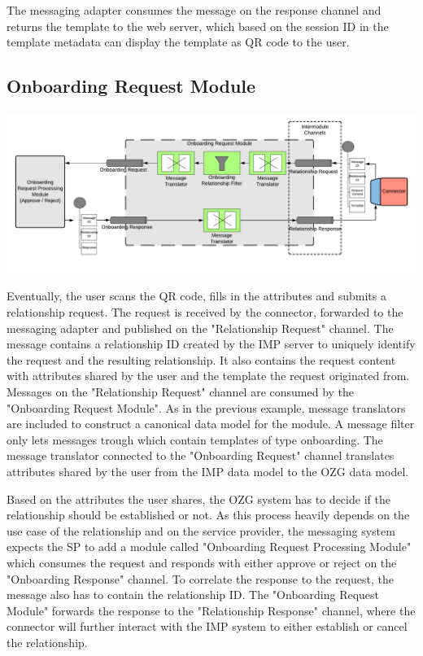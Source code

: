 The messaging adapter consumes the message on the response channel and returns the template to the web server, which based on the session ID in the template metadata can display the template as QR code to the user.

\subsection{Onboarding Request Module}

\begin{center}
    \includegraphics[scale=0.6]{Diagrams/Integration Architecture 1/Technological Integration/7. Onboarding Request Module.pdf}
\end{center}

Eventually, the user scans the QR code, fills in the attributes and submits a relationship request. The request is received by the connector, forwarded to the messaging adapter and published on the "Relationship Request" channel. The message contains a relationship ID created by the IMP server to uniquely identify the request and the resulting relationship. It also contains the request content with attributes shared by the user and the template the request originated from. Messages on the "Relationship Request" channel are consumed by the "Onboarding Request Module". As in the previous example, message translators are included to construct a canonical data model for the module. A message filter only lets messages trough which contain templates of type onboarding. The message translator connected to the "Onboarding Request" channel translates attributes shared by the user from the IMP data model to the OZG data model.

Based on the attributes the user shares, the OZG system has to decide if the relationship should be established or not. As this process heavily depends on the use case of the relationship and on the service provider, the messaging system expects the SP to add a module called "Onboarding Request Processing Module" which consumes the request and responds with either approve or reject on the "Onboarding Response" channel. To correlate the response to the request, the message also has to contain the relationship ID. The "Onboarding Request Module" forwards the response to the "Relationship Response" channel, where the connector will further interact with the IMP system to either establish or cancel the relationship.


